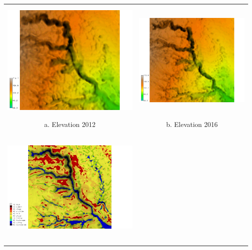 \documentclass{standalone}
\begin{document}


\small\sf\centering
\begin{tabular}{m{} m{}}
%
%
\multicolumn{1}{c}{\includegraphics[height=60mm]{../../images/sample_data/gully_elevation_2012.png}} &
\multicolumn{1}{c}{\includegraphics[height=60mm]{../../images/sample_data/gully_elevation_2016.png}}\\
\multicolumn{1}{c}{a. Elevation 2012} & \multicolumn{1}{c}{b. Elevation 2016}\\
%
\includegraphics[height=60mm,center]{../../images/sample_data/gully_landforms_2012.png} &

\end{tabular}
\end{document}
